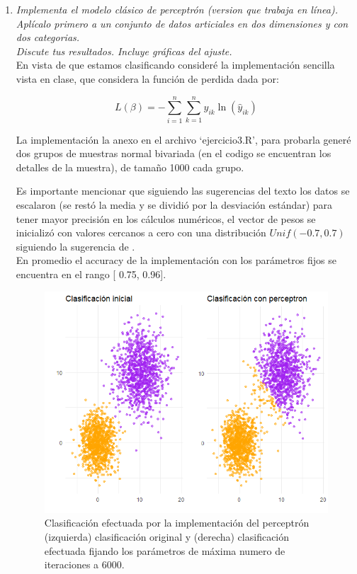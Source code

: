\documentclass[paper=letter, fontsize=11pt]{scrartcl}
\numberwithin{equation}{section} %
\numberwithin{figure}{section} %
\numberwithin{table}{section} %
\begin{document}
\begin{enumerate}
\item \textit{Implementa el modelo clásico de perceptrón (version que trabaja en línea). Aplícalo
primero a un conjunto de datos articiales en dos dimensiones y con dos categorias.\\
Discute tus resultados. Incluye gráficas del ajuste.}\\

En vista de que estamos clasificando consideré la implementación sencilla vista en clase, que considera la función de perdida dada por:
 
\[
L(\beta) = -\sum_{i=1}^n \sum_{k=1}^ny_{ik}\ln( \hat{y}_{ik}) 
\]


La implementación la anexo en el archivo ‘ejercicio3.R’, para probarla generé dos grupos de muestras normal bivariada (en el codigo se encuentran los detalles de la muestra), de tamaño 1000 cada grupo.

Es importante mencionar que siguiendo las sugerencias del texto \cite{Hes} los datos se escalaron (se restó la media y se dividió por la desviación estándar) para tener mayor precisión en los cálculos numéricos, el vector de pesos se inicializó con valores cercanos a cero con una distribución $Unif(-0.7,0.7)$ siguiendo la sugerencia de \cite{Hes}. \\
En promedio el accuracy de la implementación con los parámetros fijos se encuentra en el rango [ 0.75, 0.96].
\begin{figure}[H]
  \begin{center}
    \includegraphics[scale=.7]{perceptron.png}
    \caption{ Clasificación efectuada por la implementación del perceptrón (izquierda) clasificación original y (derecha) clasificación efectuada fijando los parámetros de máxima numero de iteraciones a 6000.}
    \label{figura2_3}
  \end{center}
\end{figure}


\end{enumerate}
\end{document}
